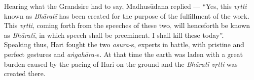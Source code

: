 Hearing what the Grandsire had to say, Madhusūdana replied --- “Yes, this \textsl{vṛtti} known as \textsl{Bhāratī} has been created for the purpose of the fulfillment of the work. This \textsl{vṛtti}, coming forth from the speeches of these two, will henceforth be known as \textsl{Bhāratī}, in which speech shall be preeminent. I shall kill these today”. Speaking thus, Hari fought the two \textsl{asura-}s, experts in battle, with pristine and perfect gestures and \textsl{aṅgahāra-}s. At that time the earth was laden with a great burden caused by the pacing of Hari on the ground and the \textsl{Bhāratī vṛtti} was created there. 

